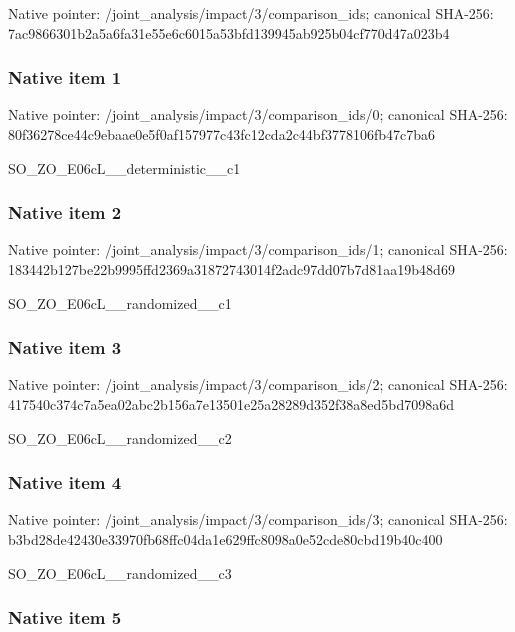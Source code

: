 \documentclass[10pt,a4paper]{article}
\begin{document}
Native pointer: /joint\_analysis/impact/3/comparison\_ids; canonical SHA-256: 7ac9866301b2a5a6fa31e55e\allowbreak{}6c6015a53bfd139945ab925b\allowbreak{}04cf770d47a023b4



\subsubsection{Native item 1}


Native pointer: /joint\_analysis/impact/3\allowbreak{}/comparison\_ids/0; canonical SHA-256: 80f36278ce44c9ebaae0e5f0\allowbreak{}af157977c43fc12cda2c44bf\allowbreak{}3778106fb47c7ba6


SO\_ZO\_E06cL\_\_deterministic\_\_c1


\subsubsection{Native item 2}


Native pointer: /joint\_analysis/impact/3\allowbreak{}/comparison\_ids/1; canonical SHA-256: 183442b127be22b9995ffd23\allowbreak{}69a31872743014f2adc97dd0\allowbreak{}7b7d81aa19b48d69


SO\_ZO\_E06cL\_\_randomized\_\_c1


\subsubsection{Native item 3}


Native pointer: /joint\_analysis/impact/3\allowbreak{}/comparison\_ids/2; canonical SHA-256: 417540c374c7a5ea02abc2b1\allowbreak{}56a7e13501e25a28289d352f\allowbreak{}38a8ed5bd7098a6d


SO\_ZO\_E06cL\_\_randomized\_\_c2


\subsubsection{Native item 4}


Native pointer: /joint\_analysis/impact/3\allowbreak{}/comparison\_ids/3; canonical SHA-256: b3bd28de42430e33970fb68f\allowbreak{}fc04da1e629ffc8098a0e52c\allowbreak{}de80cbd19b40c400


SO\_ZO\_E06cL\_\_randomized\_\_c3


\subsubsection{Native item 5}
\end{document}
